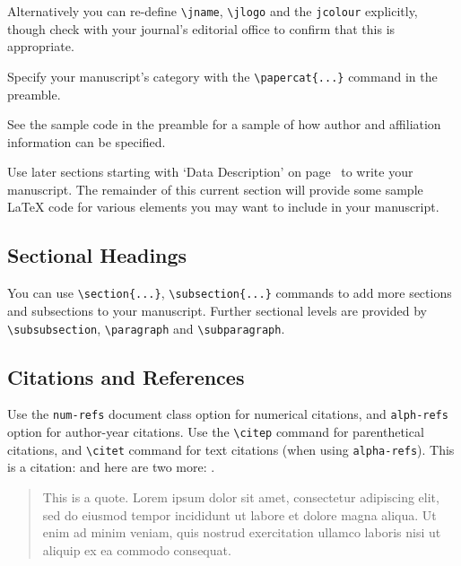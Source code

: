 \documentclass[a4paper,num-refs,gigabyte]{oup-contemporary}
\begin{document}
Alternatively you can re-define \verb|\jname|, \verb|\jlogo| and the \verb|jcolour| explicitly, though check with your journal's editorial office to confirm that this is appropriate.

Specify your manuscript's category with the \verb|\papercat{...}| command in the preamble.

See the sample code in the preamble for a sample of how author and affiliation information can be specified.

Use later sections starting with `Data Description' on page~\pageref{sec:background} to write your manuscript. The remainder of this current section will provide some sample \LaTeX{} code for various elements you may want to include in your manuscript.

\subsection{Sectional Headings}
You can use \verb|\section{...}|, \verb|\subsection{...}| commands to add more sections and subsections to your manuscript. Further sectional levels are provided by \verb|\subsubsection|, \verb|\paragraph| and \verb|\subparagraph|.

\subsection{Citations and References}
Use the \verb|num-refs| document class option for numerical citations, and \verb|alph-refs| option for author-year citations.
Use the \verb|\citep| command for parenthetical citations, and \verb|\citet| command for text citations (when using \verb|alpha-refs|).
This is a citation: \citep{Fan:2004} and here are two more: \citep{Cox:1972,Hear:Holm:Step:quan:2006}.

\begin{quote}
This is a quote. Lorem ipsum dolor sit amet, consectetur adipiscing elit, sed do eiusmod tempor incididunt ut labore et dolore magna aliqua. Ut enim ad minim veniam, quis nostrud exercitation ullamco laboris nisi ut aliquip ex ea commodo consequat. 
\end{quote}
\end{document}
